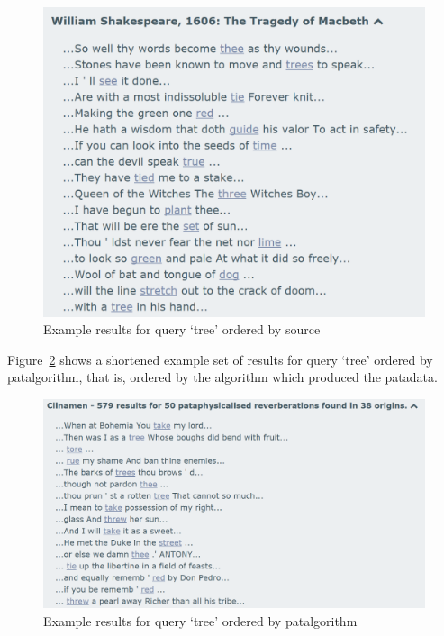 \begin{figure}[!htbp] %
  \centering
  \includegraphics[width=\linewidth]{images/listsourcetree}
\caption[Source result list for query `tree']{Example results for query `tree' ordered by source}
\label{img:listsourcetree}
\end{figure}

Figure~\ref{img:listalgotree} shows a shortened example set of results for query `tree' ordered by patalgorithm, that is, ordered by the algorithm which produced the patadata.

\begin{figure}[!htbp] %
  \centering
  \includegraphics[width=\linewidth]{images/listalgotree}
\caption[Source result list for query `tree']{Example results for query `tree' ordered by patalgorithm}
\label{img:listalgotree}
\end{figure}


